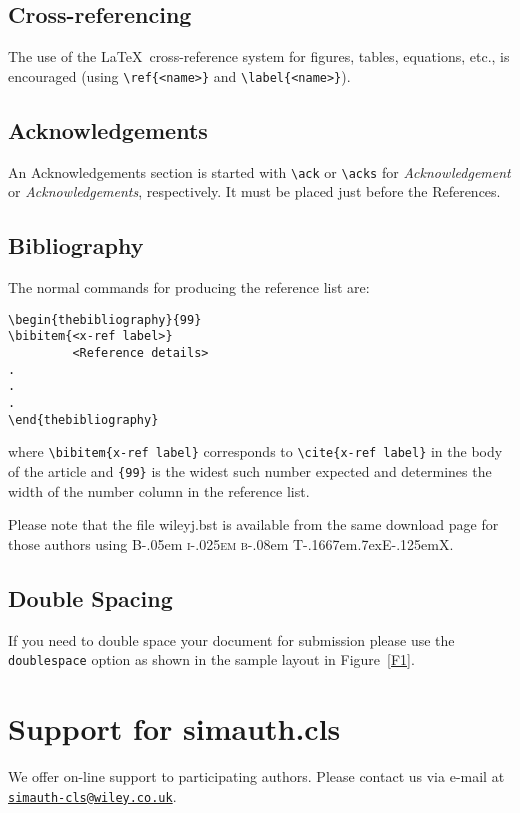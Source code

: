 \documentclass[times]{simauth}
\newcommand\BibTeX{{\rmfamily B\kern-.05em \textsc{i\kern-.025em b}\kern-.08em
T\kern-.1667em\lower.7ex\hbox{E}\kern-.125emX}}
\begin{document}
\subsection{Cross-referencing}
The use of the \LaTeX\ cross-reference system
for figures, tables, equations, etc., is encouraged
(using \verb"\ref{<name>}" and \verb"\label{<name>}").

\subsection{Acknowledgements} An Acknowledgements section is started with \verb"\ack" or
\verb"\acks" for \textit{Acknowledgement} or
\textit{Acknowledgements}, respectively. It must be placed just
before the References.

\pagebreak

\subsection{Bibliography}
The normal commands for producing the reference list are:
\begin{verbatim}
\begin{thebibliography}{99}
\bibitem{<x-ref label>}
         <Reference details>
.
.
.
\end{thebibliography}
\end{verbatim}
where \verb"\bibitem{x-ref label}" corresponds to
\verb"\cite{x-ref label}" in the body of the article and
\verb"{99}" is the widest such number expected and determines the
width of the number column in the reference list.

Please note that the file \textsf{wileyj.bst} is available from
the same download page for those authors using \BibTeX.

\subsection{Double Spacing}
If you need to double space your document for submission please
use the \verb+doublespace+ option as shown in the sample layout in
Figure~\ref{F1}.

\section{Support for \textsf{simauth.cls}}
We offer on-line support to participating authors. Please contact
us via e-mail at\\
\href{mailto:simauth-cls@wiley.co.uk}{\texttt{simauth-cls@wiley.co.uk}}.
\end{document}
